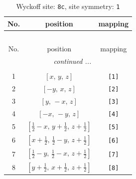\documentclass[fleqn,8pt]{jsarticle}
\begin{document}
\renewcommand{\arraystretch}{1.2}
\begin{longtable}{ccc}
\caption{Wyckoff site: {\tt 8c}, site symmetry: {\tt 1}}
 \\
 \hline \hline
No. & position & mapping \\ \hline \endfirsthead

\multicolumn{2}{l}{\tablename\ \thetable{}} \\
 \hline \hline
No. & position & mapping \\ \hline \endhead

 \hline \hline
\multicolumn{2}{r}{\footnotesize\it continued ...} \\ \endfoot

 \hline \hline
\multicolumn{2}{r}{} \\ \endlastfoot

1 & $\left[ x,\, y,\, z \right]$ & {\tt [1]} \\ \hline
2 & $\left[ - y,\, x,\, z \right]$ & {\tt [2]} \\ \hline
3 & $\left[ y,\, - x,\, z \right]$ & {\tt [3]} \\ \hline
4 & $\left[ - x,\, - y,\, z \right]$ & {\tt [4]} \\ \hline
5 & $\left[ \frac{1}{2} - x,\, y + \frac{1}{2},\, z + \frac{1}{2} \right]$ & {\tt [5]} \\ \hline
6 & $\left[ x + \frac{1}{2},\, \frac{1}{2} - y,\, z + \frac{1}{2} \right]$ & {\tt [6]} \\ \hline
7 & $\left[ \frac{1}{2} - y,\, \frac{1}{2} - x,\, z + \frac{1}{2} \right]$ & {\tt [7]} \\ \hline
8 & $\left[ y + \frac{1}{2},\, x + \frac{1}{2},\, z + \frac{1}{2} \right]$ & {\tt [8]} \\
\end{longtable}
\end{document}
